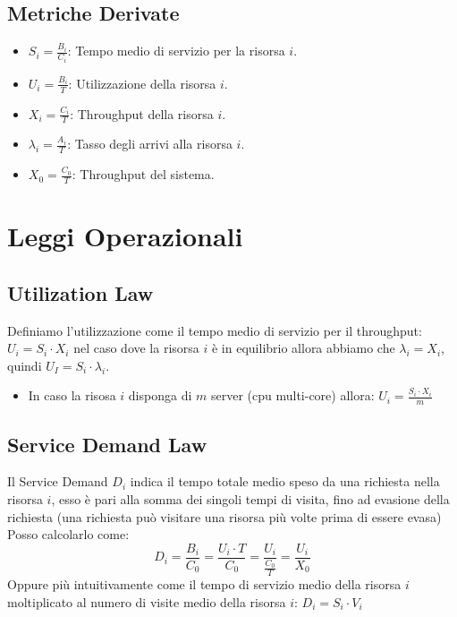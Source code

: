 \documentclass[11pt,a4paper]{article}
\begin{document}
    \subsection{Metriche Derivate}
    \begin{itemize}
        \item \textbf{$S_i = \frac{B_i}{C_i}$}: Tempo medio di servizio per la risorsa $i$.
        \item \textbf{$U_i = \frac{B_i}{T}$}: Utilizzazione della risorsa $i$.
        \item \textbf{$X_i = \frac{C_i}{T}$}: Throughput della risorsa $i$.
        \item \textbf{$\lambda_i = \frac{A_i}{T}$}: Tasso degli arrivi alla risorsa $i$.
        \item \textbf{$X_0 = \frac{C_0}{T}$}: Throughput del sistema.
    \end{itemize}

    \section{Leggi Operazionali}
    
    \subsection{Utilization Law}
    Definiamo l'utilizzazione come il tempo medio di servizio per il throughput: $U_i = S_i\cdot X_i$ nel caso dove la risorsa $i$ è in equilibrio allora abbiamo che $\lambda_i = X_i$, quindi $U_I = S_i\cdot \lambda_i$.
    \begin{itemize}
        \item In caso la risosa $i$ disponga di $m$ server (cpu multi-core) allora: $U_i = \frac{S_i\cdot X_i}{m}$
    \end{itemize}

    \subsection{Service Demand Law}
    Il Service Demand $D_i$ indica il tempo totale medio speso da una richiesta nella risorsa $i$, esso è pari alla somma dei singoli tempi di visita, fino ad evasione della richiesta (una richiesta può visitare una risorsa più volte prima di essere evasa)
    Posso calcolarlo come:
    \begin{equation}
        D_i = \frac{B_i}{C_0} = \frac{U_i\cdot T}{C_0} = \frac{U_i}{\frac{C_0}{T}} = \frac{U_i}{X_0}
    \end{equation}
    Oppure più intuitivamente come il tempo di servizio medio della risorsa $i$ moltiplicato al numero di visite medio della risorsa $i$: $D_i = S_i\cdot V_i$
\end{document}

